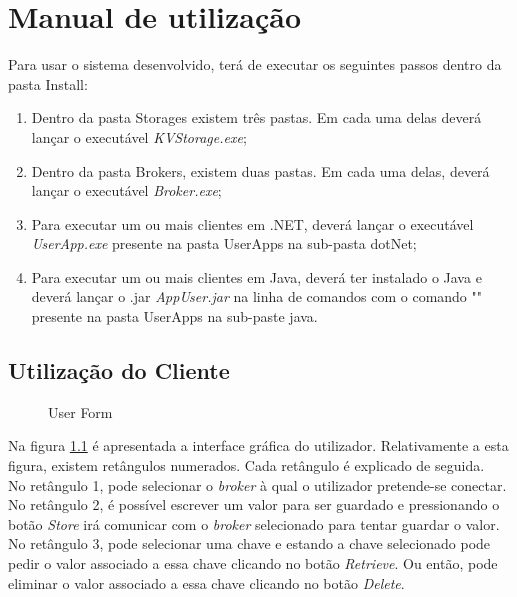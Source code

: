 \chapter{Manual de utilização} \label{manual}

Para usar o sistema desenvolvido, terá de executar os seguintes passos dentro da pasta Install:

\begin{enumerate}
	\item Dentro da pasta Storages existem três pastas. Em cada uma delas deverá lançar o executável \textit{KVStorage.exe};
	\item Dentro da pasta Brokers, existem duas pastas. Em cada uma delas, deverá lançar o executável \textit{Broker.exe};
	\item Para executar um ou mais clientes em .NET, deverá lançar o executável \textit{UserApp.exe} presente na pasta UserApps na sub-pasta dotNet;
	\item Para executar um ou mais clientes em Java, deverá ter instalado o Java e deverá lançar o .jar \textit{AppUser.jar} na linha de comandos com o comando "" presente na pasta UserApps na sub-paste java.
\end{enumerate}

\section{Utilização do Cliente}

\begin{figure}[h]
	\caption{User Form}
	\label{form}
\end{figure}

Na figura \ref{form} é apresentada a interface gráfica do utilizador.
Relativamente a esta figura, existem retângulos numerados. Cada retângulo é explicado de seguida.\\

No retângulo 1, pode selecionar o \textit{broker} à qual o utilizador pretende-se conectar.\\

No retângulo 2, é possível escrever um valor para ser guardado e pressionando o botão \textit{Store} irá comunicar com o \textit{broker} selecionado para tentar guardar o valor.\\

No retângulo 3, pode selecionar uma chave e estando a chave selecionado pode pedir o valor associado a essa chave clicando no botão \textit{Retrieve}. Ou então, pode eliminar o valor associado a essa chave clicando no botão \textit{Delete}.